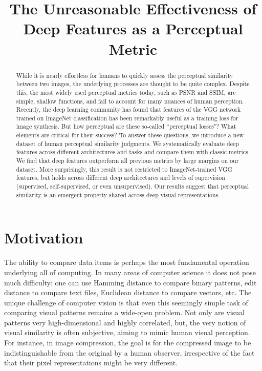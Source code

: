 \title{The Unreasonable Effectiveness of Deep Features as a Perceptual Metric}

\begin{abstract}
While it is nearly effortless for humans to quickly assess the perceptual similarity between two images, the  underlying processes are thought to be quite complex. Despite this, the most widely used perceptual metrics today, such as PSNR and SSIM, are simple, shallow functions, and fail to account for many nuances of human perception. Recently, the deep learning community has found that features of the VGG network trained on ImageNet classification has been remarkably useful as a training loss for image synthesis. But how perceptual are these so-called ``perceptual losses"? What elements are critical for their success? To answer these questions, we introduce a new dataset of human perceptual similarity judgments. We systematically evaluate deep features across different architectures and tasks and compare them with classic metrics. We find that deep features outperform all previous metrics by large margins on our dataset. More surprisingly, this result is not restricted to ImageNet-trained VGG features, but holds across different deep architectures and levels of supervision (supervised, self-supervised, or even unsupervised). Our results suggest that perceptual similarity is an emergent property shared across deep visual representations.
\end{abstract}

\section{Motivation}

The ability to compare data items is perhaps the most fundamental operation underlying all of computing.  In many areas of computer science it does not pose much difficulty: one can use Hamming distance to compare binary patterns, edit distance to compare text files, Euclidean distance to compare vectors, etc.  The unique challenge of computer vision is that even this seemingly simple task of comparing visual patterns remains a wide-open problem.  Not only are visual patterns very high-dimensional and highly correlated, but, the very notion of visual similarity is often subjective, aiming to mimic human visual perception.  For instance, in image compression, the goal is for the compressed image to be indistinguishable from the original by a human observer, irrespective of the fact that their pixel representations might be very different. 

